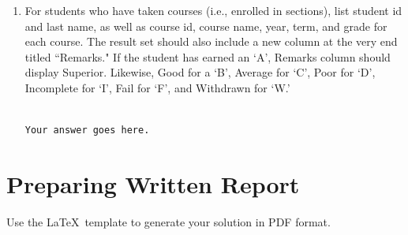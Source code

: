 \documentclass[11pt]{article}
\begin{document}
\begin{enumerate}
\item For students who have taken courses (i.e., enrolled in sections), list student id and last name, as well as course id, course name, year, term, and grade for each course. The result set should also include a new column at the very end titled ``Remarks." If the student has earned an `A', Remarks column should display Superior. Likewise, Good for a `B', Average for `C', Poor for `D', Incomplete for `I', Fail for `F', and Withdrawn for `W.'

\begin{verbatim}

Your answer goes here.

\end{verbatim}


\end{enumerate}


\section{Preparing Written Report}

Use the \LaTeX{}\ template to generate your solution in PDF format.
\end{document}
